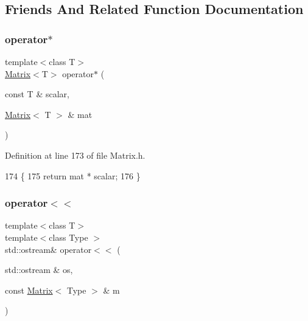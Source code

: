 \subsection{Friends And Related Function Documentation}
\mbox{\label{classLuna_1_1Matrix_a805a2d09b76344fd53ea5517f69711da}} 
\subsubsection{\texorpdfstring{operator$\ast$}{operator*}}
{\footnotesize\ttfamily template$<$class T$>$ \\
\hyperlink{classLuna_1_1Matrix}{Matrix}$<$T$>$ operator$\ast$ (\begin{DoxyParamCaption}\item[{const T \&}]{scalar,  }\item[{\hyperlink{classLuna_1_1Matrix}{Matrix}$<$ T $>$ \&}]{mat }\end{DoxyParamCaption})\hspace{0.3cm}{\ttfamily [friend]}}



Definition at line 173 of file Matrix.\+h.


\begin{DoxyCode}
174     \{
175       \textcolor{keywordflow}{return} mat * scalar;
176     \}
\end{DoxyCode}
\mbox{\label{classLuna_1_1Matrix_a8a1fa54fea16289853aa9b484116c68f}} 
\subsubsection{\texorpdfstring{operator$<$$<$}{operator<<}}
{\footnotesize\ttfamily template$<$class T$>$ \\
template$<$class Type $>$ \\
std\+::ostream\& operator$<$$<$ (\begin{DoxyParamCaption}\item[{std\+::ostream \&}]{os,  }\item[{const \hyperlink{classLuna_1_1Matrix}{Matrix}$<$ Type $>$ \&}]{m }\end{DoxyParamCaption})\hspace{0.3cm}{\ttfamily [friend]}}



